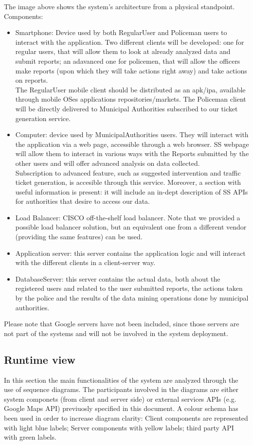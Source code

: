 The image above shows the system's architecture from a physical standpoint.
Components:
\begin{itemize}
\item Smartphone: Device used by both RegularUser and Policeman users to interact with the application. Two different clients will be developed: one for regular users, that will allow them to look at already analyzed data and submit reports; an adavanced one for policemen, that will allow the officers make reports (upon which they will take actions right away) and take actions on reports.\\
The RegularUser mobile client should be distributed as an apk/ipa, available through mobile OSes applications repositories/markets. The Policeman client will be directly delivered to Municipal Authorities subscribed to our ticket generation service.

\item Computer: device used by MunicipalAuthorities users. They will interact with the application via a web page, accessible through a web browser. SS webpage will allow them to interact in various ways with the Reports submitted by the other users and will offer advanced analysis on data collected. \\
Subscription to advanced feature, such as suggested intervention and traffic ticket generation, is accesible through this service. Moreover, a section with useful information is present: it will include an in-dept description of SS APIs for authorities that desire to access our data.
\item Load Balancer: CISCO off-the-shelf load balancer. Note that we provided a possible load balancer solution, but an equivalent one from a different vendor (providing the same features) can be used. 
\item Application server: this server contains the application logic and will interact with the different clients in a client-server way.
\item DatabaseServer: this server contains the actual data, both about the registered users and related to the user submitted reports, the actions taken by the police and the results of the data mining operations done by municipal authorities.
\end{itemize}
Please note that Google servers have not been included, since those servers are not part of the systems and will not be involved in the system deployment.
\newpage

\subsection{Runtime view}
In this section the main functionalities of the system are analyzed through the use of sequence diagrams. The participants involved in the diagrams are either system componets (from client and server side) or external services APIs (e.g. Google Maps API) previuosly specified in this document.\newline
A colour schema has been used in order to increase diagram clarity: Client components are represented with light blue labels; Server components with yellow labels; third party API with green labels.

